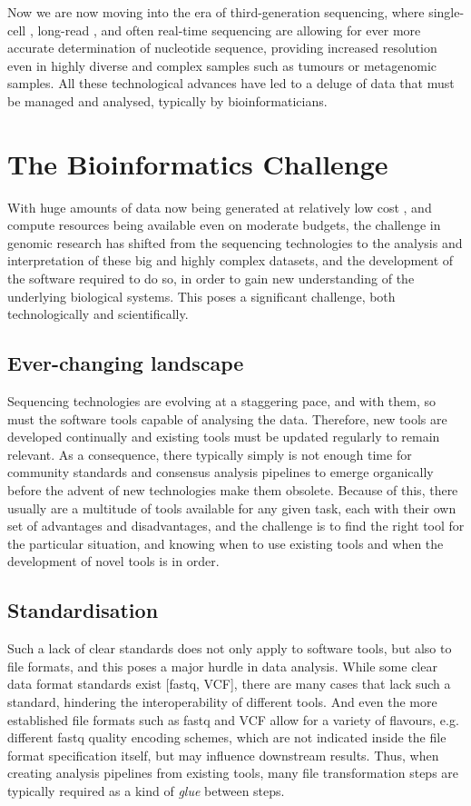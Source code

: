 Now we are now moving into the era of third-generation sequencing, where single-cell \cite{gawad2016single}, long-read \cite{koren2015one}, and often real-time sequencing \cite{flusberg2010direct} are allowing for ever more accurate determination of nucleotide sequence, providing increased resolution even in highly diverse and complex samples such as tumours or metagenomic samples. All these technological advances have led to a deluge of data that must be managed and analysed, typically by bioinformaticians.


\section{The Bioinformatics Challenge}

With huge amounts of data now being generated at relatively low cost \cite{chen2014big}, and compute resources being available even on moderate budgets, the challenge in genomic research has shifted from the sequencing technologies to the analysis and interpretation of these big and highly complex datasets, and the development of the software required to do so, in order to gain new understanding of the underlying biological systems. This poses a significant challenge, both technologically and scientifically.

\subsection{Ever-changing landscape}
Sequencing technologies are evolving at a staggering pace, and with them, so must the software tools capable of analysing the data. Therefore, new tools are developed continually and existing tools must be updated regularly to remain relevant. As a consequence, there typically simply is not enough time for community standards and consensus analysis pipelines to emerge organically before the advent of new technologies make them obsolete. Because of this, there usually are a multitude of tools available for any given task, each with their own set of advantages and disadvantages, and the challenge is to find the right tool for the particular situation, and knowing when to use existing tools and when the development of novel tools is in order.

\subsection{Standardisation}
Such a lack of clear standards does not only apply to software tools, but also to file formats, and this poses a major hurdle in data analysis. While some clear data format standards exist [fastq, VCF], there are many cases that lack such a standard, hindering the interoperability of different tools. And even the more established file formats such as fastq and VCF allow for a variety of flavours, e.g. different fastq quality encoding schemes, which are not indicated inside the file format specification itself, but may influence downstream results. Thus, when creating analysis pipelines from existing tools, many file transformation steps are typically required as a kind of \textit{glue} between steps.

